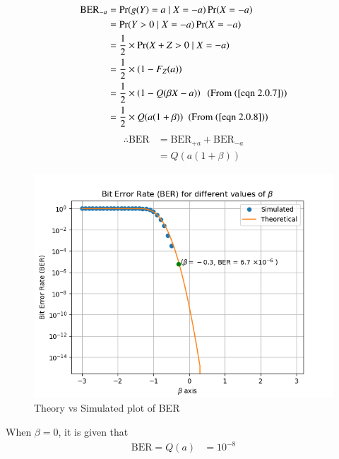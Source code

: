 \documentclass[journal,10pt,twocolumn]{IEEEtran}
\begin{document}
\begin{align}
\text{BER}_{-a} %
&= \Pr(g(Y) = a \;|\; X = -a) \Pr(X=-a)\\
&= \Pr(Y > 0 \;|\; X = -a) \Pr(X=-a)\\
&= \dfrac{1}{2} \times \Pr(X+Z > 0 \;|\; X = -a) \\
&= \dfrac{1}{2} \times \left( 1 - F_Z(a) \right) \\
&= \dfrac{1}{2} \times \left( 1 - Q(\beta X -a) \right) \; \text{ (From (\ref{eqn 2.0.7}))}\\
&= \dfrac{1}{2} \times Q(a(1+\beta)) \; \text{ (From (\ref{eqn 2.0.8}))}
\end{align}
\begin{align}
\therefore \text{BER} &= \text{BER}_{+a} + \text{BER}_{-a}\\
&= Q(a(1+\beta))
\end{align} 
\begin{figure}[!hbt]
    \centering
	\includegraphics[width=\columnwidth]{./Figures/Figure_2.png}
    \caption{Theory vs Simulated plot of BER}
    \label{CDF_Y}
\end{figure}
When $\beta = 0$, it is given that 
\begin{align}
\text{BER} = Q(a) &= 10^{-8}
\end{align}
\end{document}
